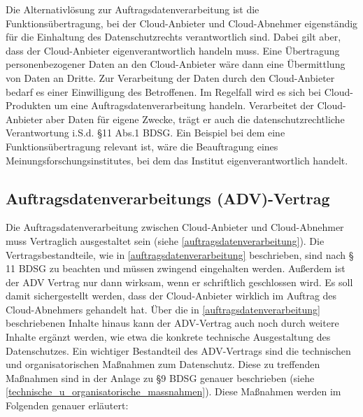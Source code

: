 Die Alternativl\"osung zur Auftragsdatenverarbeitung ist die Funktions\"ubertragung, bei der Cloud-Anbieter und Cloud-Abnehmer eigenst\"andig f\"ur die Einhaltung des Datenschutzrechts verantwortlich sind. Dabei gilt aber, dass der Cloud-Anbieter eigenverantwortlich handeln muss. Eine \"Ubertragung personenbezogener Daten an den Cloud-Anbieter w\"are dann eine \"Ubermittlung von Daten an Dritte. Zur Verarbeitung der Daten durch den Cloud-Anbieter bedarf es einer Einwilligung des Betroffenen.\newline 
Im Regelfall wird es sich bei Cloud-Produkten um eine Auftragsdatenverarbeitung handeln. Verarbeitet der Cloud-Anbieter aber Daten f\"ur eigene Zwecke, tr\"agt er auch die datenschutzrechtliche Verantwortung i.S.d. §11 Abs.1 BDSG. Ein Beispiel bei dem eine Funktions\"ubertragung relevant ist, w\"are die Beauftragung eines Meinungsforschungsinstitutes, bei dem das Institut eigenverantwortlich handelt. 
 \subsection{Auftragsdatenverarbeitungs (ADV)-Vertrag}
Die Auftragsdatenverarbeitung zwischen Cloud-Anbieter und Cloud-Abnehmer muss Vertraglich ausgestaltet sein (siehe \vref{auftragsdatenverarbeitung}). Die Vertragsbestandteile, wie in \vref{auftragsdatenverarbeitung} beschrieben, sind nach § 11 BDSG zu beachten und m\"ussen zwingend eingehalten werden.\newline
Au{\ss}erdem ist der ADV Vertrag nur dann wirksam, wenn er schriftlich geschlossen wird. Es soll damit sichergestellt werden, dass der Cloud-Anbieter wirklich im Auftrag des Cloud-Abnehmers gehandelt hat. \"Uber die in \vref{auftragsdatenverarbeitung} beschriebenen Inhalte hinaus kann der ADV-Vertrag auch noch durch weitere Inhalte erg\"anzt werden, wie etwa die konkrete technische Ausgestaltung des Datenschutzes.\newline
Ein wichtiger Bestandteil des ADV-Vertrags sind die technischen und organisatorischen Ma{\ss}nahmen zum Datenschutz. Diese zu treffenden Ma{\ss}nahmen sind in der Anlage zu §9 BDSG genauer beschrieben (siehe \vref{technische_u_organisatorische_massnahmen}).  Diese Ma{\ss}nahmen werden im Folgenden genauer erl\"autert: 

